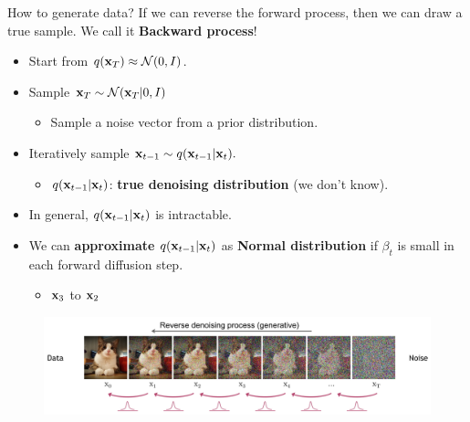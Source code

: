 	How to generate data? If we can reverse the forward process, then we can draw a true sample. We call it \textbf{Backward process}!
	\begin{itemize}
		\item Start from $q({\mathbf{x}}_T)\approx \mathcal{N}(0,I)$.
		\item Sample ${\mathbf{x}}_T\sim \mathcal{N}({\mathbf{x}}_T|0,I)$
			\begin{itemize}
				\item Sample a noise vector from a prior distribution.
			\end{itemize}
		\item Iteratively sample ${\mathbf{x}}_{t-1}\sim q({\mathbf{x}}_{t-1}|{\mathbf{x}}_t).$ 
			\begin{itemize}
				\item $q({\mathbf{x}}_{t-1}|{\mathbf{x}}_t)$: \textbf{true denoising distribution} (we don't know).
			\end{itemize}
		\item In general, $q({\mathbf{x}}_{t-1}|{\mathbf{x}}_t)$ is intractable.
		\item We can \textbf{approximate} $q({\mathbf{x}}_{t-1}|{\mathbf{x}}_t)$ as \textbf{Normal distribution} if $\beta_t$ is small in each forward diffusion step.
			\begin{itemize}
				\item \eg ${\mathbf{x}}_3$ to ${\mathbf{x}}_2$
			\end{itemize}
	\end{itemize}
	\begin{figure}[h]
		\centering
		\includegraphics[scale=0.30]{./images/diffusion/reverse.png}
	\end{figure}
	\href{https://cvpr2022-tutorial-diffusion-models.github.io/}{\tiny {}}

